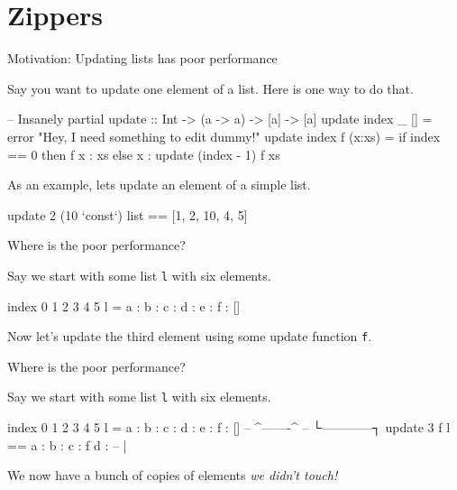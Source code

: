 \documentclass[ignorenonframetext,]{beamer}
\begin{document}
\section{Zippers}\label{zippers}

\begin{frame}[fragile]{Motivation: Updating lists has poor performance}

Say you want to update one element of a list. Here is one way to do
that.

\begin{haskellcode}
-- Insanely partial
update :: Int -> (a -> a) -> [a] -> [a]
update index _ [] = error "Hey, I need something to edit dummy!"
update index f (x:xs) = if index == 0
                        then f x : xs
                        else x : update (index - 1) f xs
\end{haskellcode}

\pause

As an example, lets update an element of a simple list.

\begin{haskellcode}
update 2 (10 `const`) list == [1, 2, 10, 4, 5]
\end{haskellcode}

\end{frame}

\begin{frame}[fragile]{Where is the poor performance?}

Say we start with some list \texttt{l} with six elements.

\begin{haskellcode}
    index
    0   1   2   3   4   5
l = a : b : c : d : e : f : []
\end{haskellcode}

Now let's update the third element using some update function
\texttt{f}.

\end{frame}

\begin{frame}[fragile]{Where is the poor performance?}

Say we start with some list \texttt{l} with six elements.

\begin{haskellcode}
    index
    0   1   2   3   4   5
l = a : b : c : d : e : f : []
--                  ^-------^
--                      └------------┐
update 3 f l == a : b : c : f d : -- |
\end{haskellcode}

We now have a bunch of copies of elements \emph{we didn't touch!}

\end{frame}
\end{document}
